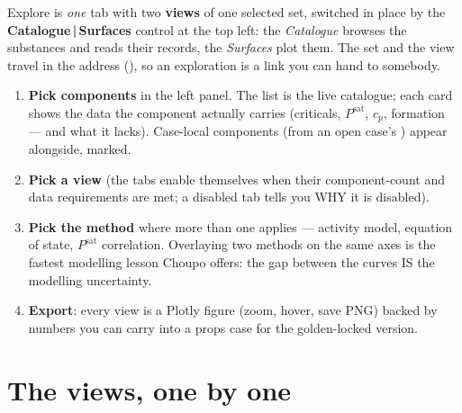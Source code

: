 \documentclass[11pt,a4paper]{article}
\begin{document}
Explore is \emph{one} tab with two \textbf{views} of one selected set,
switched in place by the \textbf{Catalogue\,|\,Surfaces} control at the top
left: the \emph{Catalogue} browses the substances and reads their records,
the \emph{Surfaces} plot them.  The set and the view travel in the address
(), so an
exploration is a link you can hand to somebody.

\begin{enumerate}[leftmargin=*,nosep]
  \item \textbf{Pick components} in the left panel.  The list is the live
        catalogue; each card shows the data the component actually carries
        (criticals, $P^{\mathrm{sat}}$, $c_p$, formation --- and what it
        lacks).  Case-local components (from an open case's
        ) appear alongside, marked.
  \item \textbf{Pick a view} (the tabs enable themselves when their
        component-count and data requirements are met; a disabled tab tells
        you WHY it is disabled).
  \item \textbf{Pick the method} where more than one applies ---
        activity model, equation of state, $P^{\mathrm{sat}}$ correlation.
        Overlaying two methods on the same axes is the fastest modelling
        lesson Choupo offers: the gap between the curves IS the modelling
        uncertainty.
  \item \textbf{Export}: every view is a Plotly figure (zoom, hover, save
        PNG) backed by numbers you can carry into a props case for the
        golden-locked version.
\end{enumerate}

\section{The views, one by one}
\end{document}
